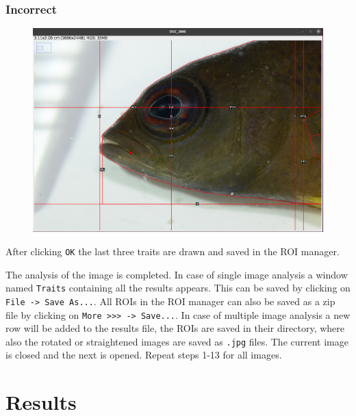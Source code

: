 \documentclass[
  letterpaper,
]{scrbook}
\begin{document}
\hypertarget{incorrect}{%
\subsubsection{\texorpdfstring{\textbf{Incorrect}}{Incorrect}}\label{incorrect}}

\begin{figure}

{\centering \includegraphics{./images/screenshots/mouth_corner_wrong.png}

}

\end{figure}

After clicking \texttt{OK} the last three traits are drawn and saved in
the ROI manager.

The analysis of the image is completed. In case of single image analysis
a window named \texttt{Traits} containing all the results appears. This
can be saved by clicking on \texttt{File\ -\textgreater{}\ Save\ As...}.
All ROIs in the ROI manager can also be saved as a zip file by clicking
on
\texttt{More\ \textgreater{}\textgreater{}\textgreater{}\ -\textgreater{}\ Save...}.
In case of multiple image analysis a new row will be added to the
results file, the ROIs are saved in their directory, where also the
rotated or straightened images are saved as \texttt{.jpg} files. The
current image is closed and the next is opened. Repeat steps 1-13 for
all images.

\hypertarget{results}{%
\section{Results}\label{results}}
\end{document}
